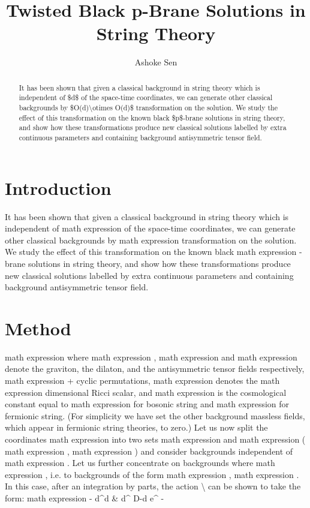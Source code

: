 \documentclass[11pt]{article}
\title{Twisted Black p-Brane Solutions in String Theory}
\author{Ashoke Sen}
\date{}
\begin{document}
\maketitle
\begin{abstract}

It has been shown that given a classical background in string theory which is independent of \$d\$ of the space-time coordinates, we can generate other classical backgrounds by \$O(d)\textbackslash{}otimes O(d)\$ transformation on the solution. We study the effect of this transformation on the known black \$p\$-brane solutions in string theory, and show how these transformations produce new classical solutions labelled by extra continuous parameters and containing background antisymmetric tensor field.

\end{abstract}

\section{Introduction}

It has been shown that given a classical background in string theory which is independent of math expression of the space-time coordinates, we can generate other classical backgrounds by math expression transformation on the solution. We study the effect of this transformation on the known black math expression -brane solutions in string theory, and show how these transformations produce new classical solutions labelled by extra continuous parameters and containing background antisymmetric tensor field.

\section{Method}

math expression where math expression , math expression and math expression denote the graviton, the dilaton, and the antisymmetric tensor fields respectively, math expression + cyclic permutations, math expression denotes the math expression dimensional Ricci scalar, and math expression is the cosmological constant equal to math expression for bosonic string and math expression for fermionic string. (For simplicity we have set the other background massless fields, which appear in fermionic string theories, to zero.) Let us now split the coordinates math expression into two sets math expression and math expression ( math expression , math expression ) and consider backgrounds independent of math expression . Let us further concentrate on backgrounds where math expression , i.e. to backgrounds of the form math expression , math expression . In this case, after an integration by parts, the action \textbackslash{} can be shown to take the form: math expression - d\textasciicircum{}d \& d\textasciicircum{} D-d e\textasciicircum{} -
\end{document}
